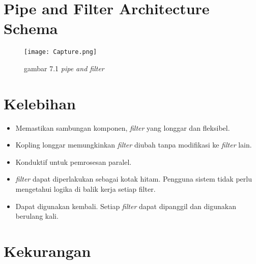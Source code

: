 	
	\section{Pipe and Filter Architecture Schema
	}
		\begin{figure}[h] 
		\begin{center} 
			\renewcommand{\figurename}{Gambar} 
			\texttt{[image: Capture.png]} 
			\caption{gambar 7.1 \textit{pipe and filter}} 
			\label{unhas} 
		\end{center} 
	\end{figure}
	
	\section{Kelebihan}
	
	\begin{itemize}
		\item Memastikan sambungan komponen, \textit{filter} yang longgar dan fleksibel.
		\item Kopling longgar memungkinkan \textit{filter} diubah tanpa modifikasi ke \textit{filter} lain.
		\item Konduktif untuk pemrosesan paralel.
		\item\textit{filter} dapat diperlakukan sebagai kotak hitam. Pengguna sistem tidak perlu mengetahui logika di balik kerja setiap filter.
		\item Dapat digunakan kembali. Setiap \textit{filter} dapat dipanggil dan digunakan berulang kali.
	\end{itemize}
	
	
	\section{Kekurangan}
	
